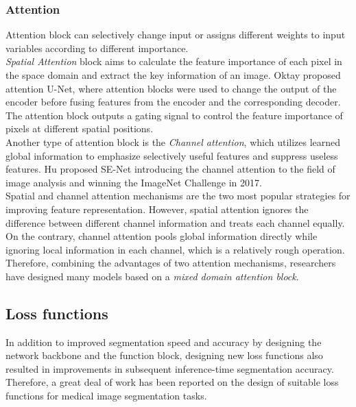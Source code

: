 \subsubsection{Attention}
\par
Attention block can selectively change input or assigns different weights to
input variables according to different importance.\\
\emph{Spatial Attention} block aims to calculate the feature importance of each
pixel in the space domain and extract the key information of an image. Oktay
\etal \cite{oktay2018attentionunet} proposed attention U-Net, where attention
blocks were used to change the output of the encoder before fusing features from
the encoder and the corresponding decoder.
The attention block outputs a gating signal to control the feature importance of
pixels at different spatial positions.\\
Another type of attention block is the \emph{Channel attention}, which utilizes
learned global information to emphasize selectively useful features and suppress
useless features. Hu \etal \cite{hu2018squeeze} proposed SE-Net introducing the
channel attention to the field of image analysis and winning the ImageNet
Challenge in 2017.\\
Spatial and channel attention mechanisms are the two most popular strategies for
improving feature representation. However, spatial attention ignores the
difference between different channel information and treats each channel
equally. On the contrary, channel attention pools global information directly
while ignoring local information in each channel, which is a relatively rough
  operation. Therefore, combining the advantages of two attention mechanisms,
  researchers have designed many models based on a \emph{mixed domain attention
  block}.

\subsection{Loss functions}
In addition to improved segmentation speed and accuracy by designing the network
backbone and the function block, designing new loss functions also resulted in
improvements in subsequent inference-time segmentation accuracy. Therefore, a
great deal of work has been reported on the design of suitable loss functions
for medical image segmentation tasks.

